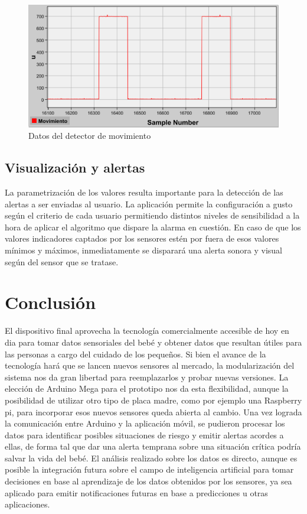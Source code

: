 \documentclass{IEEEtran}
\begin{document}
				\begin{figure}
					\centering
					\includegraphics[width=1\linewidth]{movimiento}
					\caption{Datos del detector de movimiento}
					\label{movimiento}
				\end{figure}

		\subsection{Visualización y alertas}

			La parametrización de los valores resulta importante para la detección de las alertas a ser enviadas al usuario. La aplicación permite la configuración a gusto según el criterio de cada usuario permitiendo distintos niveles de sensibilidad a la hora de aplicar el algoritmo que dispare la alarma en cuestión. En caso de que los valores indicadores captados por los sensores estén por fuera de esos valores mínimos y máximos, inmediatamente se disparará una alerta sonora y visual según del sensor que se tratase.

	\section{Conclusión}

		El dispositivo final aprovecha la tecnología comercialmente accesible de hoy en dia para tomar datos sensoriales del bebé y obtener datos que resultan útiles para las personas a cargo del cuidado de los pequeños. Si bien el avance de la tecnología hará que se lancen nuevos sensores al mercado, la modularización del sistema nos da gran libertad para reemplazarlos y probar nuevas versiones. La elección de Arduino Mega para el prototipo nos da esta flexibilidad, aunque la posibilidad de utilizar otro tipo de placa madre, como por ejemplo una Raspberry pi, para incorporar esos nuevos sensores queda abierta al cambio.
		Una vez lograda la comunicación entre Arduino y la aplicación móvil, se pudieron procesar los datos para identificar posibles situaciones de riesgo y emitir alertas acordes a ellas, de forma tal que dar una alerta temprana sobre una situación crítica podría salvar la vida del bebé. El análisis realizado sobre los datos es directo, aunque es posible la integración futura sobre el campo de inteligencia artificial para tomar decisiones en base al aprendizaje de los datos obtenidos por los sensores, ya sea aplicado para emitir notificaciones futuras en base a predicciones u otras aplicaciones.
\end{document}
